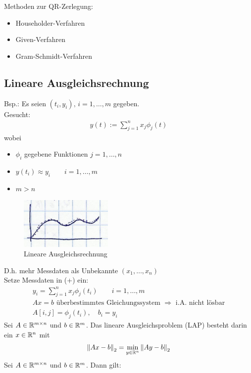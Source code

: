 Methoden zur QR-Zerlegung:
\begin{itemize}
  \item Householder-Verfahren
  \item Given-Verfahren
  \item Gram-Schmidt-Verfahren
\end{itemize}

\subsection{Lineare Ausgleichsrechnung}
Bsp.: Es seien $(t_i, y_i),\,i=1,\ldots,m$ gegeben.\\
Gesucht: 
\begin{align*}
  y(t) := \sum^{n}_{j=1} x_j \phi_j(t) \tag{ + }
\end{align*}
wobei
\begin{itemize}
  \item $\phi_i$ gegebene Funktionen $j=1,\ldots,n$
  \item $y(t_i) \approx y_i \qquad i=1,\ldots,m$
  \item $m > n$
\end{itemize}
\begin{figure}
  \centering
  \includegraphics[width=0.4\textwidth]{figures/lineare_ausgleichsrechnung.png}
  \caption{Lineare Ausgleichsrechnung}
\end{figure}
D.h. mehr Messdaten als Unbekannte $(x_1,\ldots,x_n)$\\
Setze Messdaten in (+) ein:
\begin{align*}
  y_i = \sum^{n}_{j=1} x_j \phi_j(t_i) \qquad i=1,\ldots,m\\
  Ax=b \text{ überbestimmtes Gleichungssystem } \Rightarrow \text{ i.A. nicht lösbar}\\
  A[i,j] = \phi_j(t_i), \quad b_i = y_i
\end{align*}
 Sei $A \in \mathbb{R}^{m \times n}$ und $b \in \mathbb{R}^{m}$. Das lineare Ausgleichsproblem (LAP) besteht darin ein $x \in \mathbb{R}^{n}$ mit
\begin{align*}
  \left\lVert Ax-b \right\rVert_2 = \underset{y \in \mathbb{R}^{n}}{\min} \left\lVert Ay - b \right\rVert_2
\end{align*}
\satz Sei $A \in \mathbb{R}^{m \times n}$ und $b \in \mathbb{R}^{m}$. Dann gilt:
